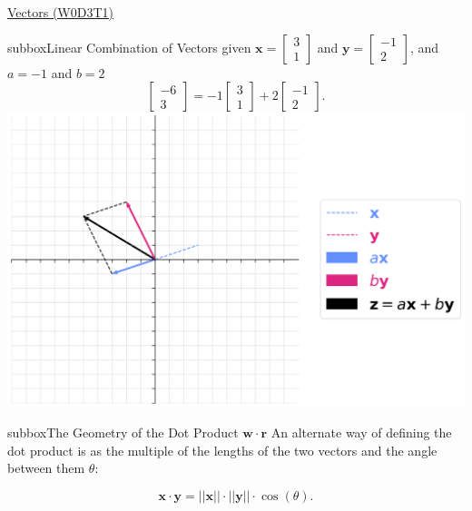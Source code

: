 \begin{textbox}{\href{https://compneuro.neuromatch.io/tutorials/W0D3_LinearAlgebra/student/W0D3_Tutorial1.html}{Vectors (W0D3T1)} }
\begin{subbox}{subbox}{Linear Combination of Vectors}
given $\mathbf{x} = \begin{bmatrix}3 \\ 1 \end{bmatrix}$ and $\mathbf{y} = \begin{bmatrix}-1 \\ 2 \end{bmatrix}$, and $a=-1$ and $b=2$
\begin{equation*}
\begin{bmatrix}-6 \\ 3 \end{bmatrix}= -1\begin{bmatrix}3 \\ 1 \end{bmatrix} +2 \begin{bmatrix}-1 \\ 2 \end{bmatrix}.
\end{equation*}
\centering
\includegraphics[scale=0.15]{Figures/PreCourse/Figure3.png}
\end{subbox}
\begin{subbox}{subbox}{The Geometry of the Dot Product $\mathbf{w}\cdot\mathbf{r}$}
\scriptsize
An alternate way of defining the dot product is as the multiple of the lengths of the two vectors and the angle between them $\theta$:

\begin{equation}
\mathbf{x} \cdot \mathbf{y} = ||\mathbf{x}|| \cdot ||\mathbf{y}|| \cdot \cos(\theta).
\end{equation}

\end{subbox}
\end{textbox}
